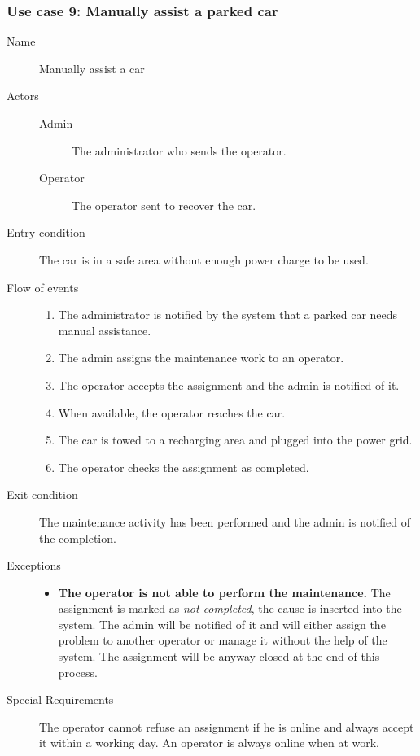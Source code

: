 	\subsubsection{Use case 9: Manually assist a parked car}
		\begin{description}
			\item[Name] Manually assist a car
			\item[Actors] \hfill
				\begin{description}
					\item[Admin] The administrator who sends the operator.
					\item[Operator] The operator sent to recover the car.
				\end{description}
			\item[Entry condition] The car is in a safe area without enough power charge to be used.
			\item[Flow of events] \hfill
				\begin{enumerate}
					\item The administrator is notified by the system that a parked car needs manual assistance.
					\item The admin assigns the maintenance work to an operator.
					\item The operator accepts the assignment and the admin is notified of it.
					\item When available, the operator reaches the car.
					\item The car is towed to a recharging area and plugged into the power grid.
					\item The operator checks the assignment as completed.
				\end{enumerate}
			\item[Exit condition] The maintenance activity has been performed and the admin is notified of the completion.
			\item[Exceptions] \hfill
				\begin{itemize}
					\item \textbf{The operator is not able to perform the maintenance.} The assignment is marked as \textit{not completed}, the cause is inserted into the system. The admin will be notified of it and will either assign the problem to another operator or manage it without the help of the system. The assignment will be anyway closed at the end of this process.
				\end{itemize}
			\item[Special Requirements] The operator cannot refuse an assignment if he is online and always accept it within a working day. An operator is always online when at work.
		\end{description}
	

